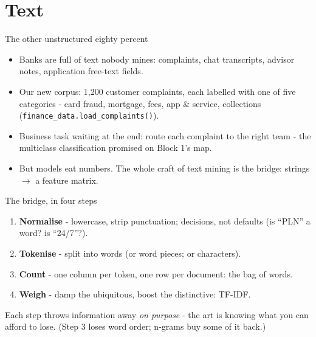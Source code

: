 \documentclass[10pt,aspectratio=169]{beamer}
\begin{document}
\section{Text}

\begin{frame}{The other unstructured eighty percent}
  \begin{itemize}
    \item Banks are full of text nobody mines: complaints, chat
          transcripts, advisor notes, application free-text fields.
    \item Our new corpus: \alert{1{,}200 customer complaints}, each labelled
          with one of five categories - card fraud, mortgage, fees, app
          \& service, collections
          (\texttt{finance\_data.load\_complaints()}).
    \item Business task waiting at the end: \alert{route each complaint to
          the right team} - the multiclass classification promised on
          Block 1's map.
    \item But models eat numbers. The whole craft of text mining is the
          bridge: \alert{strings $\to$ a feature matrix}.
  \end{itemize}
\end{frame}

\begin{frame}{The bridge, in four steps}
  \begin{enumerate}
    \item \textbf{Normalise} - lowercase, strip punctuation; decisions,
          not defaults (is ``PLN'' a word? is ``24/7''?).
    \item \textbf{Tokenise} - split into words (or word pieces; or
          characters).
    \item \textbf{Count} - one column per token, one row per document:
          the \alert{bag of words}.
    \item \textbf{Weigh} - damp the ubiquitous, boost the distinctive:
          \alert{TF-IDF}.
  \end{enumerate}
  \vspace{0.5em}
  \begin{center}
    Each step throws information away \emph{on purpose} - the art is
    knowing what you can afford to lose. (Step 3 loses word order;
    n-grams buy some of it back.)
  \end{center}
\end{frame}
\end{document}
